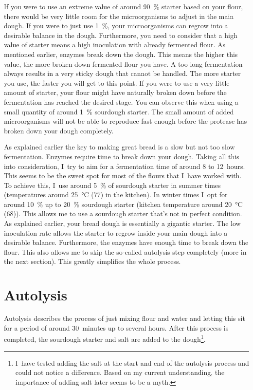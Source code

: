 If you were to use an extreme value of around \qty{90}{\percent} starter based on your flour, there
would be very little room for the microorganisms to adjust in the main dough.
If you were to just use \qty{1}{\percent}, your microorganisms can regrow into a
desirable balance in the dough. Furthermore, you need to consider that a high value
of starter means a high inoculation with already fermented flour. As
mentioned earlier, enzymes break down the dough. This means the higher this
value, the more broken-down fermented flour you have. A too-long fermentation
always results in a very sticky dough that cannot be handled. The more
starter you use, the faster you will get to this point. If you were to use a
very little amount of starter, your flour might have naturally broken down
before the fermentation has reached the desired stage. You can observe this
when using a small quantity of around \qty{1}{\percent} sourdough starter. The small
amount of added microorganisms will not be able to reproduce fast enough
before the protease has broken down your dough completely.

As explained earlier the key to making great bread is a slow but not too slow
fermentation. Enzymes require time to break down your dough. Taking all this
into consideration, I~try to aim for a fermentation time of around 8 to 12~hours. This seems to be
the sweet spot for most of the flours that I~have worked with. To achieve this,
I~use around \qty{5}{\percent} of sourdough starter in summer times
(temperatures around \qty{25}{\degreeCelsius} (\qty{77}{\degF}) in the
kitchen). In winter times I~opt for around \qty{10}{\percent} up to
\qty{20}{\percent} sourdough starter (kitchen temperature around
\qty{20}{\degreeCelsius} (\qty{68}{\degF})). This
allows me to use a sourdough starter that's not in perfect condition. As
explained earlier, your
bread dough is essentially a gigantic starter. The low inoculation rate allows
the starter to regrow inside your main dough into a desirable balance.
Furthermore, the enzymes have enough time to break down the flour. This also
allows me to skip the so-called autolysis step completely (more in the next section).
This greatly simplifies the whole process.

\section{Autolysis}%
\label{section:autolysis}

Autolysis describes the process of just mixing flour and water and letting
this sit for a period of around 30~minutes up to several hours. After this
process is completed, the sourdough starter and salt are added to the
dough\footnote{I~have tested adding the salt at the start and end of the
autolysis process and could not notice a difference. Based on my current
understanding, the importance of adding salt later seems to be a myth.}.

